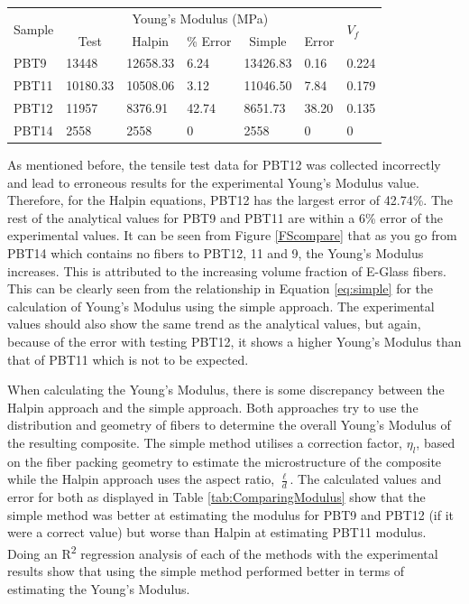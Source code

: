 \documentclass[11pt]{article}
\begin{document}
\newpage
\begin{center}
 \label{tab:ComparingModulus}
\begin{tabular}{p{1.25cm} || p{1.5cm} | p{1.5cm} | p{1.5cm} | p{1.5cm} | p{1.5cm} | p{1.5cm}}
\hline
 \multirow{2}{*}{Sample} & \multicolumn{5}{c|}{Young's Modulus (MPa)} & \multirow{2}{*}{\(V_f\)} \\
   &  \multicolumn{1}{c}{Test} & \multicolumn{1}{c}{Halpin} & \multicolumn{1}{c}{\% Error} & \multicolumn{1}{c}{Simple} & \multicolumn{1}{c|}{ Error} \\
\hline
PBT9 & 13448 & 12658.33 & 6.24 & 13426.83 & 0.16 & 0.224\\
PBT11 & 10180.33 & 10508.06 & 3.12 & 11046.50 & 7.84 &  0.179\\
PBT12 & 11957 & 8376.91 & 42.74 & 8651.73 & 38.20 & 0.135 \\
PBT14 & 2558 & 2558 & 0 & 2558 & 0 & 0\\
\hline
\end{tabular}
\end{center}
\singlespacing

As mentioned before, the tensile test data for PBT12 was collected incorrectly and lead to erroneous results for the experimental Young's Modulus value. Therefore, for the Halpin equations, PBT12 has the largest error of 42.74\%. The rest of the analytical values for PBT9 and PBT11 are within a 6\% error of the experimental values. It can be seen from Figure \ref{FScompare} that as you go from PBT14 which contains no fibers to PBT12, 11 and  9, the Young's Modulus increases. This is attributed to the increasing volume fraction of E-Glass fibers. This can be clearly seen from the relationship in Equation \ref{eq:simple} for the calculation of Young's Modulus using the simple approach. The experimental values should also show the same trend as the analytical values, but again, because of the error with testing PBT12, it shows a higher Young's Modulus than that of PBT11 which is not to be expected. 

When calculating the Young's Modulus, there is some discrepancy between the Halpin approach and the simple approach. Both approaches try to use the distribution and geometry of fibers to determine the overall Young's Modulus of the resulting composite. The simple method utilises a correction factor, \(\eta_l\), based on the fiber packing geometry to estimate the microstructure of the composite while the Halpin approach uses the aspect ratio, \(\frac{\ell}{d}\). The calculated values and error for both as displayed in Table \ref{tab:ComparingModulus} show that the simple method was better at estimating the modulus for PBT9 and PBT12 (if it were a correct value) but worse than Halpin at estimating PBT11 modulus. Doing an R\textsuperscript{2} regression analysis of each of the methods with the experimental results show that using the simple method performed better in terms of estimating the Young's Modulus.
\end{document}
